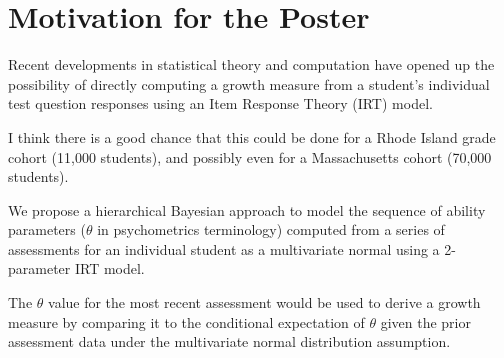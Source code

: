 \documentclass{amsart}
\begin{document}
\section*{Motivation for the Poster}
Recent developments in statistical theory and computation have opened up the possibility of directly computing a growth measure from a student's individual test question responses using an Item Response Theory (IRT) model. 
\par\vspace{0.4 cm}
I think there is a good chance that this could be done for a Rhode Island grade cohort (11,000 students), and possibly even for a Massachusetts cohort (70,000 students).
\par\vspace{0.4 cm}
We propose a hierarchical Bayesian approach to model the sequence of ability parameters ($\theta$ in psychometrics terminology) computed from a series of assessments for an individual student as a multivariate normal using a 2-parameter IRT model.  
\par\vspace{0.4 cm}
The $\theta$ value for the most recent assessment would be used to derive a growth measure by comparing it to the conditional expectation of $\theta$ given the prior assessment data under the multivariate normal distribution assumption.
\end{document}
